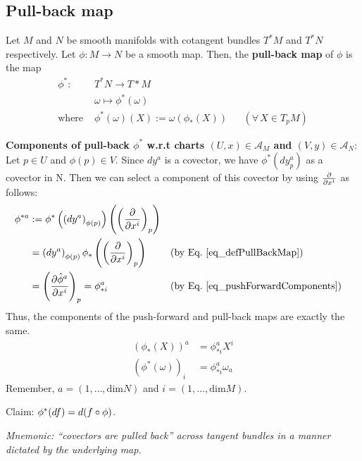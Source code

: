 \subsection{Pull-back map}
\begin{definition}
Let $M$ and $N$ be smooth manifolds with cotangent bundles $T^\ast M$ and $T^\ast N$ respectively. Let $\phi : M \to N$ be a smooth map. Then, the \textbf{pull-back map} of $\phi$ is the map
\begin{align}
\phi^{\ast} : & T^\ast N \to T\ast M \nonumber \\
& \omega \mapsto \phi^\ast(\omega) \nonumber \\
\label{eq_defPullBackMap}\text{where } & \phi^\ast(\omega)(X) := \omega (\phi_\ast(X)) && (\forall \, X \in T_pM)
\end{align}
\end{definition}

\textbf{Components of pull-back $\phi^\ast$ w.r.t charts $(U,x) \in \mathcal{A}_M$ and $(V,y) \in \mathcal{A}_N$}: Let $p \in U$ and $\phi(p) \in V$. Since $dy^a$ is a covector, we have $\phi^\ast(dy^a_p)$ as a covector in N. Then we can select a component of this covector by using $\cibasis{x^i}$ as follows: \\
\begin{align*}
\phi^{\ast a} & := \phi^\ast\left(\left(dy^a\right)_{\phi(p)}\right) \left(\left(\cibasis{x^i}\right)_p\right) \\
& = \left(dy^a\right)_{\phi(p)} \phi_\ast \left(\left(\cibasis{x^i}\right)_p\right) && (\text{by Eq.~\ref{eq_defPullBackMap}}) \\
& = \left(\cibasis[\hat{\phi}^a]{x^i}\right)_p  = \phi^a_{\ast i} && (\text{by Eq.~\ref{eq_pushForwardComponents}})
\end{align*}
Thus, the components of the push-forward and pull-back maps are exactly the same.
\begin{align*}
\left(\phi_\ast\left(X\right)\right)^a & = \phi^a_{\ast i} X^i \\
\left(\phi^\ast\left(\omega\right)\right)_i & = \phi^a_{\ast i} \omega_a
\end{align*}
Remember, $a = (1, \dotsc, \text{dim} N)$ and $i = (1, \dotsc, \text{dim} M)$.

Claim: $\phi^\ast(df) = d(f \after \phi)$. 

\textit{Mnemonic: ``covectors are pulled back'' across tangent bundles in a manner dictated by the underlying map.}

